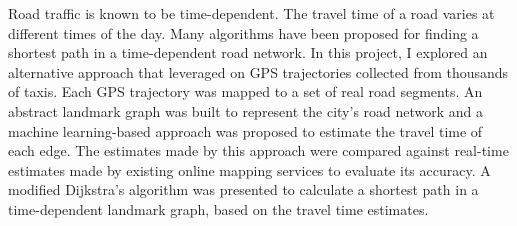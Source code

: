 % 
% 
%
Road traffic is known to be time-dependent. The travel time of a road varies at different times of the day. Many algorithms have been proposed for finding a shortest path in a time-dependent road network. In this project, I explored an alternative approach that leveraged on GPS trajectories collected from thousands of taxis. Each GPS trajectory was mapped to a set of real road segments. An abstract landmark graph was built to represent the city's road network and a machine learning-based approach was proposed to estimate the travel time of each edge. The estimates made by this approach were compared against real-time estimates made by existing online mapping services to evaluate its accuracy. A modified Dijkstra's algorithm was presented to calculate a shortest path in a time-dependent landmark graph, based on the travel time estimates. 
